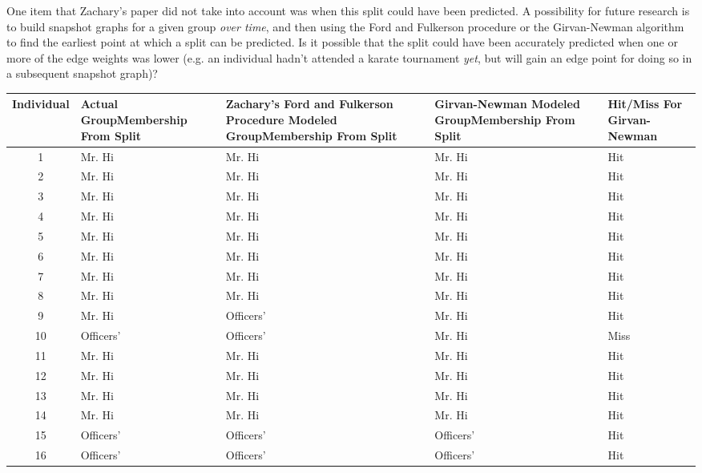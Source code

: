 \documentclass[letterpaper,11pt]{article}
\begin{document}
One item that Zachary's paper did not take into account was when this split could have been predicted.  A possibility for future research is to build snapshot graphs for a given group \emph{over time}, and then using the Ford and Fulkerson procedure or the Girvan-Newman algorithm to find the earliest point at which a split can be predicted.  Is it possible that the split could have been accurately predicted when one or more of the edge weights was lower (e.g. an individual hadn't attended a karate tournament \emph{yet}, but will gain an edge point for doing so in a subsequent snapshot graph)?

\clearpage
\begin{table}
\small
\begin{tabular}{ | c | p{2cm} | p{2cm} | p{2cm} | p{2cm} | }
\hline
Individual & Actual Group\newline Membership From Split & Zachary's Ford and Fulkerson Procedure Modeled Group\newline Membership From Split & Girvan-Newman Modeled Group\newline Membership From Split & Hit/Miss For Girvan-Newman\\
\hline
1 & Mr. Hi & Mr. Hi & Mr. Hi & Hit \\
\hline
2 & Mr. Hi & Mr. Hi & Mr. Hi & Hit \\
\hline
3 & Mr. Hi & Mr. Hi & Mr. Hi & Hit \\
\hline
4 & Mr. Hi & Mr. Hi & Mr. Hi & Hit \\
\hline
5 & Mr. Hi & Mr. Hi & Mr. Hi & Hit \\
\hline
6 & Mr. Hi & Mr. Hi & Mr. Hi & Hit \\
\hline
7 & Mr. Hi & Mr. Hi & Mr. Hi & Hit \\
\hline
8 & Mr. Hi & Mr. Hi & Mr. Hi & Hit \\
\hline
9 & Mr. Hi & Officers' & Mr. Hi & Hit \\
\hline
10 & Officers' & Officers' & Mr. Hi & Miss \\
\hline
11 & Mr. Hi & Mr. Hi & Mr. Hi & Hit \\
\hline
12 & Mr. Hi & Mr. Hi & Mr. Hi & Hit \\
\hline
13 & Mr. Hi & Mr. Hi & Mr. Hi & Hit \\
\hline
14 & Mr. Hi & Mr. Hi & Mr. Hi & Hit \\
\hline
15 & Officers' & Officers' & Officers' & Hit \\
\hline
16 & Officers' & Officers' & Officers' & Hit \\

\end{tabular}
\end{table}
\end{document}
